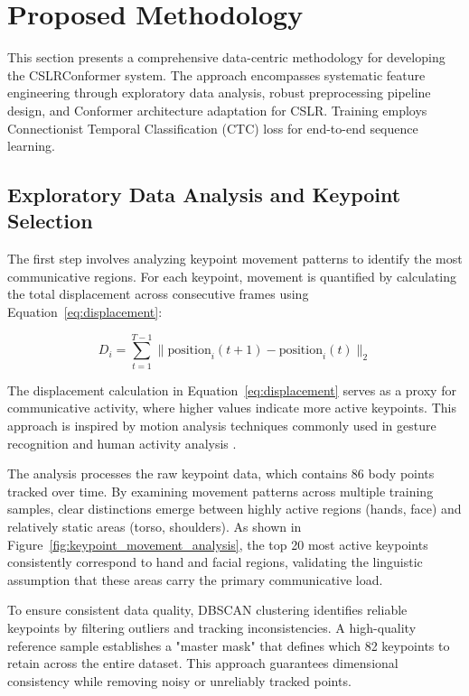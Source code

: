 \section{Proposed Methodology}
\label{sec:methodology}

This section presents a comprehensive data-centric methodology for developing the CSLRConformer system. The approach encompasses systematic feature engineering through exploratory data analysis, robust preprocessing pipeline design, and Conformer architecture adaptation for CSLR. Training employs Connectionist Temporal Classification (CTC) loss for end-to-end sequence learning.

\subsection{Exploratory Data Analysis and Keypoint Selection}

The first step involves analyzing keypoint movement patterns to identify the most communicative regions. For each keypoint, movement is quantified by calculating the total displacement across consecutive frames using Equation~\ref{eq:displacement}:

\begin{equation}
D_i = \sum_{t=1}^{T-1} \|\text{position}_i(t+1) - \text{position}_i(t)\|_2
\label{eq:displacement}
\end{equation}

The displacement calculation in Equation~\ref{eq:displacement} serves as a proxy for communicative activity, where higher values indicate more active keypoints. This approach is inspired by motion analysis techniques commonly used in gesture recognition \cite{huang2024video} and human activity analysis \cite{camgoz2018neural}.

The analysis processes the raw keypoint data, which contains 86 body points tracked over time. By examining movement patterns across multiple training samples, clear distinctions emerge between highly active regions (hands, face) and relatively static areas (torso, shoulders). As shown in Figure~\ref{fig:keypoint_movement_analysis}, the top 20 most active keypoints consistently correspond to hand and facial regions, validating the linguistic assumption that these areas carry the primary communicative load.

To ensure consistent data quality, DBSCAN clustering \cite{deng2020dbscan} identifies reliable keypoints by filtering outliers and tracking inconsistencies. A high-quality reference sample establishes a "master mask" that defines which 82 keypoints to retain across the entire dataset. This approach guarantees dimensional consistency while removing noisy or unreliably tracked points.

